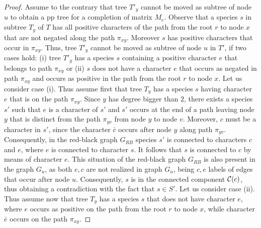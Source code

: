 \documentclass{llncs}
\begin{document}
\begin{proof}
Assume to the contrary that tree $T'_y$   cannot be moved as subtree of node $u$ to obtain a pp tree for a completion of matrix $M_e$. Observe that a species $s$ in subtree $T_y$  of $T$ has all positive characters of the path  from the root $r$ to node $x$  that are not negated along the path $\pi_{xy}$.  Moreover $s$ has positive characters that occur in $\pi_{xy}$. Thus, tree $T'_y$  cannot be moved as subtree of node $u$ in $T'$,  if   two cases hold: (i)  tree $T'_y$ has a species $s$ containing a  positive character  $e$  that belongs to path ${\pi}_{xy}$ or (ii) $s$  does not have a character $e$ that occurs  as negated in path ${\pi}_{xy}$ and occurs as positive in the path from the root $r$ to node $x$.
Let us consider case (i). Thus assume first that tree $T_y$ has a species $s$ having character $e$  that is on the path ${\pi}_{xy}$.  Since $y$ has degree bigger than $2$, there exists a species $s'$ such that $e$ is a character of $s'$ and $s'$ occurs at the end of  a path leaving  node $y$ that is distinct from the path $\pi_{yv}$ from node $y$ to node $v$.  Moreover, $c$ must be a character in $s'$, since the character $\bar{c}$ occurs after node $y$ along path $\pi_{yv}$.
Consequently, in the red-black graph $G_{RB}$ species $s'$ is connected to characters $c$ and $e$, where $e$ is connected to character $s$. It follows that $s$ is connected to $c$ by means of character $e$.
This situation of the red-black graph $G_{RB}$ is also present in the graph 
$G_u$, as both $e, c$ are not   realized in graph $G_u$, being $c, e$ labels of edges that occur after node $u$.  Consequently,  $s$ is in the   connected component ${\cal C}(c)$, thus obtaining  a contradiction with the fact that $s \in S'$.
Let us consider case (ii). 
Thus assume now that tree $T_y$ has a species $s$ that does not have character $e$, where $e$ occurs as positive on the path from the root $r$ to node $x$, while  character $\bar{e}$   occurs on the path ${\pi}_{xy}$. 

\end{proof}
\end{document}

